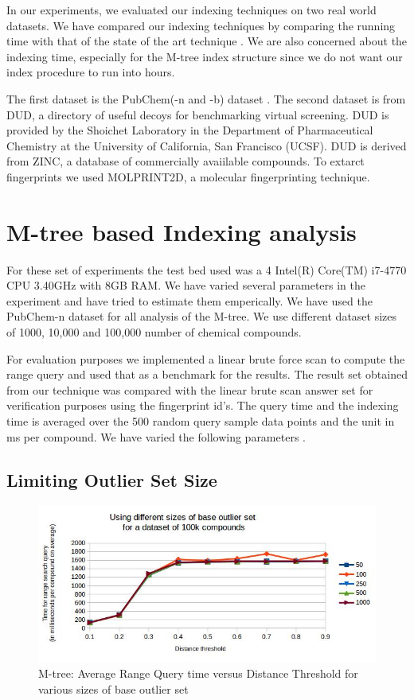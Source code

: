 
In our experiments, we evaluated our indexing techniques on two real world datasets. We have compared our indexing techniques by comparing the running time with that of the state of the art technique  . We are also concerned about the indexing time, especially for the M-tree index structure since we do not want our index procedure to run into hours.

The first dataset is the PubChem(-n and -b) dataset . The second dataset is from DUD, a directory of useful decoys for benchmarking virtual screening. DUD is provided by the Shoichet Laboratory in the Department of Pharmaceutical Chemistry at the University of California, San Francisco (UCSF). DUD is derived from ZINC, a database of commercially avaiilable compounds. To extarct fingerprints we used MOLPRINT2D, a molecular fingerprinting technique.


\section{M-tree based Indexing analysis}	

For these set of experiments the test bed used was a 4 Intel(R) Core(TM) i7-4770 CPU \@ 3.40GHz with 8GB RAM. We have varied several parameters in the experiment and have tried to estimate them emperically. We have used the PubChem-n dataset for all analysis of the M-tree. We use different dataset sizes of 1000, 10,000 and 100,000 number of chemical compounds.

For evaluation purposes we implemented a linear brute force scan to compute the range query and used that as a benchmark for the results. The result set obtained from our technique was compared with the linear brute scan answer set for verification purposes using the fingerprint id's. The query time and the indexing time is averaged over the 500 random query sample data points and the unit in ms per compound. We have varied the following parameters .


\subsection{Limiting Outlier Set Size }

\begin{figure}[ht]	
\centering
\includegraphics[width=1 \columnwidth]{img/image1.jpg}
\caption{M-tree: Average Range Query time versus Distance Threshold for various sizes of base outlier set}
\label{fig:5.1}
\end{figure}

